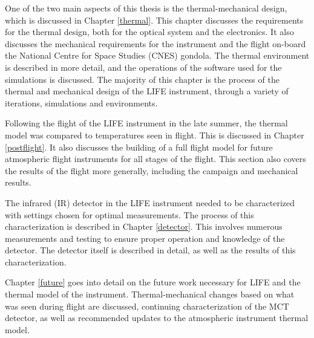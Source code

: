 One of the two main aspects of this thesis is the thermal-mechanical design, which is discussed in Chapter \ref{thermal}. This chapter discusses the requirements for the thermal design, both for the optical system and the electronics. It also discusses the mechanical requirements for the instrument and the flight on-board the National Centre for Space Studies (CNES) gondola. The thermal environment is described in more detail, and the operations of the software used for the simulations is discussed. The majority of this chapter is the process of the thermal and mechanical design of the LIFE instrument, through a variety of iterations, simulations and environments.

Following the flight of the LIFE instrument in the late summer, the thermal model was compared to temperatures seen in flight. This is discussed in Chapter \ref{postflight}. It also discusses the building of a full flight model for future atmospheric flight instruments for all stages of the flight. This section also covers the results of the flight more generally, including the campaign and mechanical results.

The infrared (IR) detector in the LIFE instrument needed to be characterized with settings chosen for optimal measurements. The process of this characterization is described in Chapter \ref{detector}. This involves numerous measurements and testing to ensure proper operation and knowledge of the detector. The detector itself is described in detail, as well as the results of this characterization.

Chapter \ref{future} goes into detail on the future work necessary for LIFE and the thermal model of the instrument. Thermal-mechanical changes based on what was seen during flight are discussed, continuing characterization of the MCT detector, as well as recommended updates to the atmospheric instrument thermal model.